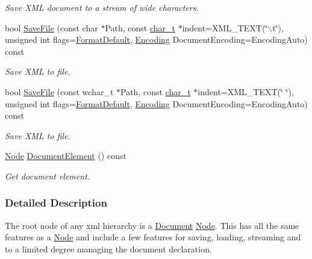 \begin{DoxyCompactItemize}
\begin{DoxyCompactList}\small\item\em Save XML document to a stream of wide characters. \item\end{DoxyCompactList}\item 
bool \hyperlink{classphys_1_1xml_1_1Document_a67c47df1019344f2b62696e2d05e6555}{SaveFile} (const char $\ast$Path, const \hyperlink{namespacephys_1_1xml_afc87705cd1c2917d87b879715a2d8f6e}{char\_\-t} $\ast$indent=XML\_\-TEXT(\char`\"{}$\backslash$t\char`\"{}), unsigned int flags=\hyperlink{namespacephys_1_1xml_a08bf6aab51f79929d9097706a5e64408}{FormatDefault}, \hyperlink{namespacephys_1_1xml_a420f5de782438f88160321385bea2015}{Encoding} DocumentEncoding=EncodingAuto) const 
\begin{DoxyCompactList}\small\item\em Save XML to file. \item\end{DoxyCompactList}\item 
bool \hyperlink{classphys_1_1xml_1_1Document_a39fd70a3f157cacc4a6e7bc6696750b9}{SaveFile} (const wchar\_\-t $\ast$Path, const \hyperlink{namespacephys_1_1xml_afc87705cd1c2917d87b879715a2d8f6e}{char\_\-t} $\ast$indent=XML\_\-TEXT(\char`\"{}	\char`\"{}), unsigned int flags=\hyperlink{namespacephys_1_1xml_a08bf6aab51f79929d9097706a5e64408}{FormatDefault}, \hyperlink{namespacephys_1_1xml_a420f5de782438f88160321385bea2015}{Encoding} DocumentEncoding=EncodingAuto) const 
\begin{DoxyCompactList}\small\item\em Save XML to file. \item\end{DoxyCompactList}\item 
\hyperlink{classphys_1_1xml_1_1Node}{Node} \hyperlink{classphys_1_1xml_1_1Document_a93d8521e3241281e15f77cf7568d5754}{DocumentElement} () const 
\begin{DoxyCompactList}\small\item\em Get document element. \item\end{DoxyCompactList}\end{DoxyCompactItemize}


\subsubsection{Detailed Description}
The root node of any xml hierarchy is a \hyperlink{classphys_1_1xml_1_1Document}{Document} \hyperlink{classphys_1_1xml_1_1Node}{Node}. This has all the same features as a \hyperlink{classphys_1_1xml_1_1Node}{Node} and include a few features for saving, loading, streaming and to a limited degree managing the document declaration. 

